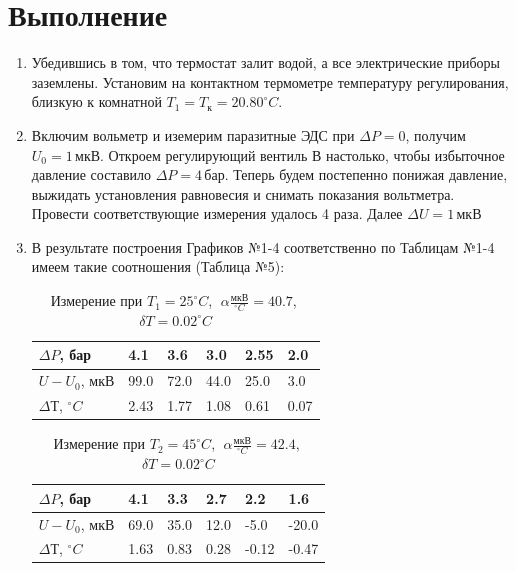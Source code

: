 \documentclass[a4paper,12pt]{article}
\begin{document}
	\section{Выполнение}
	\begin{enumerate}
		\item Убедившись в том, что термостат залит водой, а все электрические приборы заземлены. Установим на контактном термометре температуру  регулирования, близкую к комнатной $T_1 = T_к = 20.80^\circ C$.
		
		\item Включим вольметр и иземерим паразитные ЭДС при $\Delta P = 0$, получим $U_0 = 1 \, мкВ$. Откроем регулирующий вентиль В настолько, чтобы избыточное давление составило $\Delta P = 4 \, бар$. Теперь будем постепенно понижая давление, выжидать установления равновесия и снимать показания вольтметра. Провести соответствующие измерения удалось 4 раза.
		Далее $\Delta U = 1 \, мкВ$
		
		
		\item В результате построения Графиков №1-4 соответственно по Таблицам №1-4 имеем такие соотношения (Таблица №5):
		
		\begin{table}[h!] 
			\caption{Измерение при $T_1 = 25^\circ C$,$\;$ $\alpha\frac{мкВ}{^\circ C} = 40.7$,$\;$ $\delta T = 0.02^\circ C$}
			\begin{center}
				\begin{tabular}{|*{6}{l|}} \hline
					$\Delta P$, бар & 4.1 & 3.6 & 3.0 & 2.55 & 2.0 \\ \hline
					$U - U_0$, мкВ & 99.0 & 72.0 & 44.0 & 25.0 & 3.0 \\ \hline
					$\Delta Т$, $^\circ C$ & 2.43 & 1.77 & 1.08 & 0.61 & 0.07 \\ \hline
				\end{tabular}
			\end{center}
		\end{table}

		\begin{table}[h!] 
			\caption{Измерение при $T_2 = 45^\circ C$,$\;$ $\alpha\frac{мкВ}{^\circ C} = 42.4$,$\;$ $\delta T = 0.02^\circ C$}
			\begin{center}
				\begin{tabular}{|*{6}{l|}} \hline
					$\Delta P$, бар & 4.1 & 3.3 & 2.7 & 2.2 & 1.6 \\ \hline
					$U - U_0$, мкВ & 69.0 & 35.0 & 12.0 & -5.0 & -20.0 \\ \hline
					$\Delta Т$, $^\circ C$ & 1.63 & 0.83 & 0.28 & -0.12 & -0.47 \\ \hline
				\end{tabular}
			\end{center}
		\end{table}
	

\end{enumerate}
\end{document}
